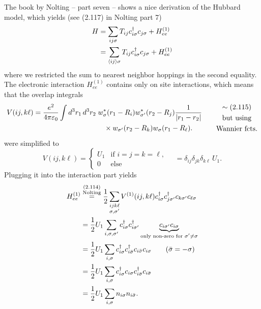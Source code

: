 \documentclass[../../main.tex]{subfiles}
\begin{document}
The book by Nolting -- part seven -- shows a nice derivation of the Hubbard model, which yields (see (2.117) in Nolting part 7)
\begin{align}
H&=\sum_{ij\sigma}T_{ij}c_{i\sigma}^\dagger c_{j\sigma}
+ H_{ee}^{(1)}
\notag\\
&=
\sum_{\langle ij\rangle\sigma}T_{ij}c_{i\sigma}^\dagger c_{j\sigma}
+ H_{ee}^{(1)}
\end{align}
where we restricted the sum to nearest neighbor hoppings in the second equality. The electronic interaction $H_{ee}^{(1)}$ contains only on site interactions, which means that the overlap integrals
\begin{equation}
\begin{aligned}
V(ij, k \ell)&=\frac{e^2}{4\pi\varepsilon_0}
\int d^3r_1\,d^3r_2\;
w_\sigma^*(r_1-R_i)w_{\sigma'}^*(r_2-R_j)
\frac{1}{|r_1-r_2|}\\
&\hspace{35mm}\times
w_{\sigma'}(r_2-R_k)w_\sigma(r_1-R_\ell).
\end{aligned}
\qquad\begin{gathered}
\sim(2.115)\\
\text{but using}\\
\text{Wannier fcts.}
\end{gathered}
\end{equation}
were simplified to
\begin{equation}
V(ij,k \ell)=
\begin{cases}
U_1&\text{if }i=j=k=\ell,\\
0&\text{else}
\end{cases}
\quad =\delta_{ij}\delta_{jk}\delta_{k\ell}\,U_1.
\end{equation}
Plugging it into the interaction part yields
\begin{align}
H_{ee}^{(1)}
&\overset{\substack{(2.114)\\\text{Nolting}}}{=}
\frac12\sum_{\substack{ijk\ell\\\sigma,\sigma'}}
V^{(1)}(ij,k \ell)
c_{i\sigma}^\dagger c_{j\sigma'}^\dagger
c_{k\sigma'}c_{\ell\sigma}
\notag\\
&=\frac12 U_1\sum_{i,\sigma,\sigma'}
c_{i\sigma}^\dagger c_{i\sigma'}^\dagger
\underbrace{c_{i\sigma'} c_{i\sigma}}_{
\substack{\text{only non-zero for }\sigma'\ne\sigma}}
\notag\\
&=\frac12 U_1\sum_{i,\sigma}
c_{i\sigma}^\dagger c_{i\bar\sigma}^\dagger
c_{i\bar\sigma}c_{i\sigma}
\qquad(\bar\sigma=-\sigma)
\notag\\
&=\frac12 U_1\sum_{i,\sigma}
c_{i\sigma}^\dagger c_{i\sigma}
c_{i\bar\sigma}^\dagger c_{i\bar\sigma}
\notag\\
&=\frac12 U_1\sum_{i,\sigma}n_{i\sigma}n_{i\bar\sigma}.
\label{eq:passetti2022-onsite}
\end{align}
\end{document}
